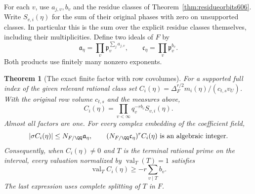 \documentclass[a4paper,11pt]{article}
\newtheorem{theorem}[proposition]{Theorem}
\theoremstyle{definition}
\theoremstyle{remark}
\numberwithin{equation}{section}
\begin{document}
For each \(v\), use \(a_{j,v},b_v\) and the residue classes of
Theorem~\ref{thm:residueorbits606}. Write \(S_{v,i}(\eta)\)
for the sum of their original phases with zero on unsupported
classes. In particular this is the sum over the explicit
residue classes themselves, including their multiplicities.
Define two ideals of \(F\) by
\[
        \mathfrak a_\eta=\prod_v\mathfrak p_v^{\sum_j a_{j,v}},
          \qquad \mathfrak c_\eta=\prod_v\mathfrak p_v^{b_v}.
\]
Both products use finitely many nonzero exponents.

\begin{theorem}[The exact finite factor with row covolumes]
\leavevmode\label{thm:rowfactor607}
For a supported full index of the given relevant rational
class set \(C_i(\eta)=\Delta_F^{r/2}m_i(\eta)/(c_{t,s}v_U)\).
With the original row volume \(c_{t,s}\) and the measures above,
\[
              C_i(\eta)=\prod_{v<\infty}q_v^{-r b_v}S_{v,i}(\eta).
\]
Almost all factors are one. For every complex embedding of
the coefficient field,
\[
      |\sigma C_i(\eta)|\le N_{F/\QQ}\mathfrak a_\eta,\qquad
      (N_{F/\QQ}\mathfrak c_\eta)^r C_i(\eta)
                       \ \text{is an algebraic integer}.
\]
Consequently, when \(C_i(\eta)\ne0\) and \(T\) is the terminal
rational prime on the interval, every valuation normalized by
\(\operatorname{val}_T(T)=1\) satisfies
\[
             \operatorname{val}_T C_i(\eta)
                       \ge -r\sum_{v\mid T} b_v .
\]
The last expression uses complete splitting of \(T\) in \(F\).
\end{theorem}
\end{document}
